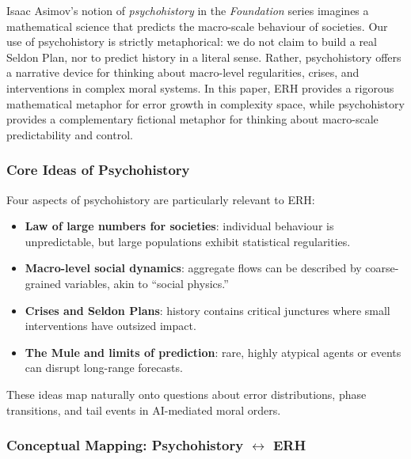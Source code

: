 \documentclass[12pt,a4paper]{article}
\theoremstyle{definition}
\theoremstyle{remark}
\begin{document}
Isaac Asimov's notion of \emph{psychohistory} in the \emph{Foundation} series imagines a mathematical science that predicts the macro-scale behaviour of societies.
Our use of psychohistory is strictly metaphorical: we do not claim to build a real Seldon Plan, nor to predict history in a literal sense.
Rather, psychohistory offers a narrative device for thinking about macro-level regularities, crises, and interventions in complex moral systems.
In this paper, ERH provides a rigorous mathematical metaphor for error growth in complexity space, while psychohistory provides a complementary fictional metaphor for thinking about macro-scale predictability and control.

\subsubsection{Core Ideas of Psychohistory}

Four aspects of psychohistory are particularly relevant to ERH:
\begin{itemize}
    \item \textbf{Law of large numbers for societies}: individual behaviour is unpredictable, but large populations exhibit statistical regularities.
    \item \textbf{Macro-level social dynamics}: aggregate flows can be described by coarse-grained variables, akin to ``social physics.''
    \item \textbf{Crises and Seldon Plans}: history contains critical junctures where small interventions have outsized impact.
    \item \textbf{The Mule and limits of prediction}: rare, highly atypical agents or events can disrupt long-range forecasts.
\end{itemize}
These ideas map naturally onto questions about error distributions, phase transitions, and tail events in AI-mediated moral orders.

\subsubsection{Conceptual Mapping: Psychohistory $\leftrightarrow$ ERH}
\end{document}
